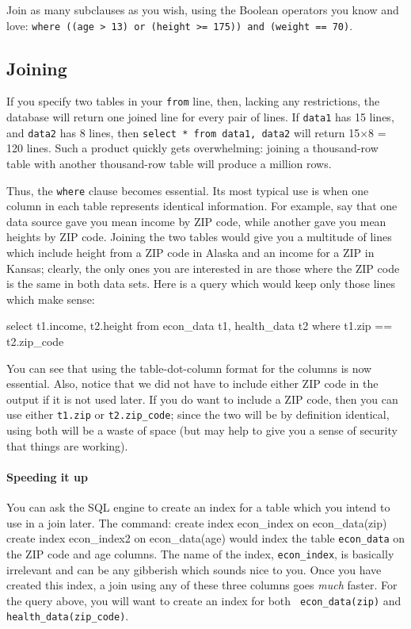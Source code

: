 Join as many subclauses as you wish, using the Boolean operators you
know and love: {\tt where ((age > 13) or (height >= 175)) and (weight == 70)}.



\subsection{Joining}
If you specify two tables in your {\tt from} line, then, lacking any
restrictions, the database will return one joined line for every pair of lines.
If {\tt data1} has 15 lines, and {\tt data2} has 8 lines, then {\tt select *
from data1, data2} will return 15$\times$8 = 120 lines.  Such a product
quickly gets overwhelming: joining a thousand-row table with another
thousand-row table will produce a million rows.

Thus, the {\tt where} clause becomes essential. Its most typical use is
when one column in each table represents identical information. For
example, say that one data source gave you mean income by ZIP code,
while another gave you mean heights by ZIP code. Joining the two tables
would give you a multitude of lines which include height from a ZIP code
in Alaska and an income for a ZIP in Kansas; clearly, the only ones you
are interested in are those where the ZIP code is the same in both data
sets. Here is a query which would keep only those lines which make
sense:

select t1.income, t2.height
   from econ_data t1, health_data t2
   where t1.zip == t2.zip_code

You can see that using the table-dot-column format for the columns is now
essential. Also, notice that we did not have to include either ZIP code
in the output if it is not used later. If you do want to include a ZIP
code, then you can use either {\tt t1.zip} or {\tt t2.zip\_code}; since
the two will be by definition identical, using both will be a waste of
space (but may help to give you a sense of security that things are working).

\paragraph{Speeding it up}
You can ask the SQL engine to create an index for a table which you
intend to use in a join later. The command:
create index econ_index on econ_data(zip)
create index econ_index2 on econ_data(age)
would index the table {\tt econ\_data} on the ZIP code and age columns.
The name of the index, {\tt econ\_index}, is basically irrelevant and can
be any gibberish which sounds nice to you. Once you have created this
index, a join using any of these three columns goes {\sl much} faster.
For the query above, you will want to create an index for both {\tt
econ\_data(zip)} and {\tt health\_data(zip\_code)}.


